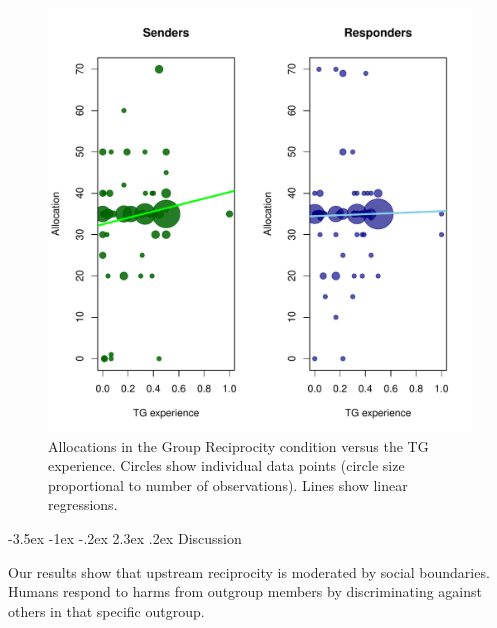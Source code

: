 \documentclass[12pt,a4paper]{article}\usepackage[]{graphicx}\usepackage[]{color}
\makeatletter
\def\maxwidth{ %
  \ifdim\Gin@nat@width>\linewidth
    \linewidth
  \else
    \Gin@nat@width
  \fi
}
\newenvironment{knitrout}{}{} %
\renewcommand\section{\@startsection {section}{1}{\z@}%
{-3.5ex \@plus -1ex \@minus -.2ex}%
{2.3ex \@plus.2ex}%
{\bf\sffamily\Large}}
\makeatother
\begin{document}
\begin{knitrout}
\color{fgcolor}\begin{figure}
\includegraphics[width=\maxwidth]{figure/plots-1} \caption[Allocations in the Group Reciprocity condition versus the TG experience]{Allocations in the Group Reciprocity condition versus the TG experience. Circles show individual data points (circle size proportional to number of observations). Lines show linear regressions.}\label{fig:plots}
\end{figure}


\end{knitrout}

\section{Discussion}
\label{sec:conclusion}

Our results show that upstream reciprocity is moderated by social boundaries. 
Humans respond to harms from outgroup members by discriminating against others 
in that specific outgroup. 
\end{document}
